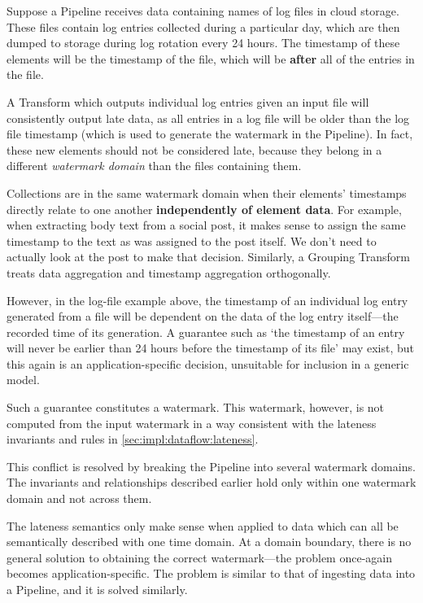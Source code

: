 Suppose a Pipeline receives data containing names of log files in cloud storage.
These files contain log entries collected during a particular day, which are then dumped to storage during log rotation every 24 hours.
The timestamp of these elements will be the timestamp of the file, which will be \textbf{after} all of the entries in the file.

A Transform which outputs individual log entries given an input file will consistently output late data, as all entries in a log file will be older than the log file timestamp (which is used to generate the watermark in the Pipeline).
In fact, these new elements should not be considered late, because they belong in a different \emph{watermark domain} than the files containing them.

Collections are in the same watermark domain when their elements' timestamps directly relate to one another \textbf{independently of element data}.
For example, when extracting body text from a social post, it makes sense to assign the same timestamp to the text as was assigned to the post itself.
We don't need to actually look at the post to make that decision.
Similarly, a Grouping Transform treats data aggregation and timestamp aggregation orthogonally.


However, in the log-file example above, the timestamp of an individual log entry generated from a file will be dependent on the data of the log entry itself---the recorded time of its generation.
A guarantee such as `the timestamp of an entry will never be earlier than 24 hours before the timestamp of its file' may exist, but this again is an application-specific decision, unsuitable for inclusion in a generic model.

Such a guarantee constitutes a watermark.
This watermark, however, is not computed from the input watermark in a way consistent with the lateness invariants and rules in \cref{sec:impl:dataflow:lateness}.

This conflict is resolved by breaking the Pipeline into several watermark domains.
The invariants and relationships described earlier hold only within one watermark domain and not across them.

The lateness semantics only make sense when applied to data which can all be semantically described with one time domain.
At a domain boundary, there is no general solution to obtaining the correct watermark---the problem once-again becomes application-specific.
The problem is similar to that of ingesting data into a Pipeline, and it is solved similarly.

